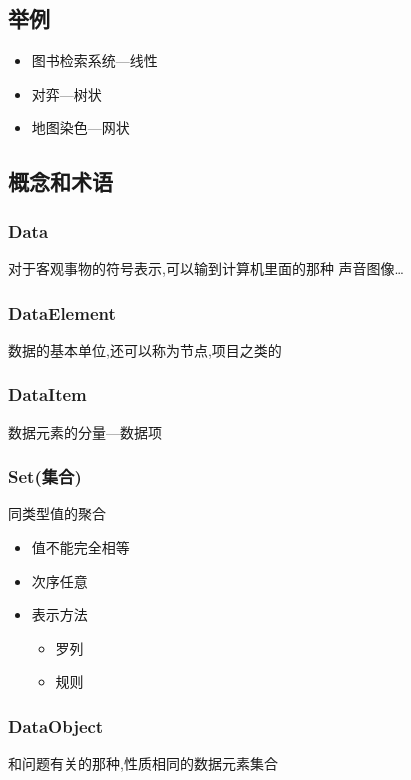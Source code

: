 \documentclass[11pt]{article}
\begin{document}
\subsection{举例}
\label{sec:orgacce55c}
\begin{itemize}
\item 图书检索系统---线性
\item 对弈---树状
\item 地图染色---网状
\end{itemize}
\subsection{概念和术语}
\label{sec:orgad55222}
\subsubsection{Data}
\label{sec:orgff9b047}
对于客观事物的符号表示,可以输到计算机里面的那种
声音图像\ldots{}
\subsubsection{DataElement}
\label{sec:org0e0b493}
数据的基本单位,还可以称为节点,项目之类的
\subsubsection{DataItem}
\label{sec:orge8dfb6d}
数据元素的分量---数据项
\subsubsection{Set(集合)}
\label{sec:org5d4760d}
同类型值的聚合 
\begin{itemize}
\item 值不能完全相等
\item 次序任意
\item 表示方法
\begin{itemize}
\item 罗列
\item 规则
\end{itemize}
\end{itemize}
\subsubsection{DataObject}
\label{sec:org8ad974a}
和问题有关的那种,性质相同的数据元素集合
\end{document}
